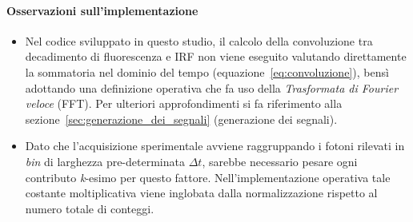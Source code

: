 \paragraph{Osservazioni sull'implementazione}
\begin{itemize}
    \item Nel codice sviluppato in questo studio, il calcolo della convoluzione tra decadimento di fluorescenza e IRF non viene eseguito valutando direttamente la sommatoria nel dominio del tempo (equazione~\ref{eq:convoluzione}), bensì adottando una definizione operativa che fa uso della \textit{Trasformata di Fourier veloce} (FFT). Per ulteriori approfondimenti si fa riferimento alla sezione~\ref{sec:generazione_dei_segnali} (generazione dei segnali).
    \item Dato che l'acquisizione sperimentale avviene raggruppando i fotoni rilevati in \textit{bin} di larghezza pre-determinata $\Delta t$, sarebbe necessario pesare ogni contributo \textit{k}-esimo per questo fattore. Nell'implementazione operativa tale costante moltiplicativa viene inglobata dalla normalizzazione rispetto al numero totale di conteggi.
\end{itemize}


